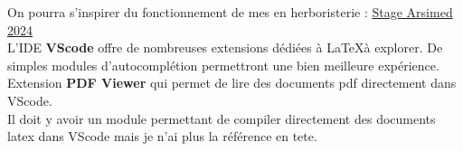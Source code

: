 \documentclass[a4paper,11pt,fleqn]{article}
\newcommand{\vocref}[2]{\href{#1}{\color{monrose}#2}}
\begin{document}
On pourra s'inspirer du fonctionnement de mes  en herboristerie : \vocref{https://github.com/Romain1099/Herboristerie-2024.git}{Stage Arsimed 2024}\\

L'IDE \textbf{VScode} offre de nombreuses extensions dédiées à \LaTeX à explorer. De simples modules d'autocomplétion permettront une bien meilleure expérience. \\

Extension \textbf{PDF Viewer} qui permet de lire des documents pdf directement dans VScode.\\
Il doit y avoir un module permettant de compiler directement des documents latex dans VScode mais je n'ai plus la référence en tete. 
\end{document}
